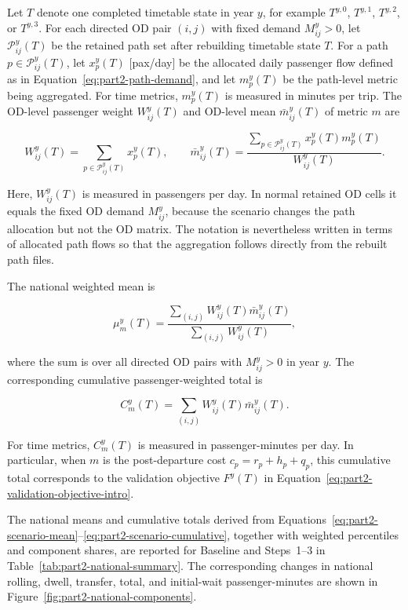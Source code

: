 \documentclass[preprint,12pt]{elsarticle}
\begin{document}
Let \(T\) denote one completed timetable state in year \(y\), for example \(T^{y,0}\), \(T^{y,1}\), \(T^{y,2}\), or \(T^{y,3}\). For each directed OD pair \((i,j)\) with fixed demand \(M_{ij}^y>0\), let \(\mathcal{P}_{ij}^{y}(T)\) be the retained path set after rebuilding timetable state \(T\). For a path \(p\in\mathcal{P}_{ij}^{y}(T)\), let \(x_p^y(T)\) [pax/day] be the allocated daily passenger flow defined as in Equation~\eqref{eq:part2-path-demand}, and let \(m_p^y(T)\) be the path-level metric being aggregated. For time metrics, \(m_p^y(T)\) is measured in minutes per trip. The OD-level passenger weight \(W_{ij}^y(T)\) and OD-level mean \(\bar m_{ij}^y(T)\) of metric \(m\) are


\begin{equation}
W_{ij}^y(T)
=
\sum_{p\in\mathcal{P}_{ij}^{y}(T)}
x_p^y(T),
\qquad
\bar m_{ij}^y(T)
=
\frac{
\sum_{p\in\mathcal{P}_{ij}^{y}(T)}
x_p^y(T)m_p^y(T)
}{
W_{ij}^y(T)
}.
\label{eq:part2-od-scenario-metric}
\end{equation}

Here, \(W_{ij}^y(T)\) is measured in passengers per day. In normal retained OD cells it equals the fixed OD demand \(M_{ij}^y\), because the scenario changes the path allocation but not the OD matrix. The notation is nevertheless written in terms of allocated path flows so that the aggregation follows directly from the rebuilt path files.

The national weighted mean is

\begin{equation}
\mu_m^y(T)
=
\frac{
\sum_{(i,j)}W_{ij}^y(T)\bar m_{ij}^y(T)
}{
\sum_{(i,j)}W_{ij}^y(T)
},
\label{eq:part2-scenario-mean}
\end{equation}

where the sum is over all directed OD pairs with \(M_{ij}^y>0\) in year \(y\). The corresponding cumulative passenger-weighted total is


\begin{equation}
C_m^y(T)
=
\sum_{(i,j)}
W_{ij}^y(T)\bar m_{ij}^y(T).
\label{eq:part2-scenario-cumulative}
\end{equation}

For time metrics, \(C_m^y(T)\) is measured in passenger-minutes per day. In particular, when \(m\) is the post-departure cost \(c_p=r_p+h_p+q_p\), this cumulative total corresponds to the validation objective \(F^y(T)\) in Equation~\eqref{eq:part2-validation-objective-intro}.

The national means and cumulative totals derived from Equations~\eqref{eq:part2-scenario-mean}--\eqref{eq:part2-scenario-cumulative}, together with weighted percentiles and component shares, are reported for Baseline and Steps~1--3 in Table~\ref{tab:part2-national-summary}. The corresponding changes in national rolling, dwell, transfer, total, and initial-wait passenger-minutes are shown in Figure~\ref{fig:part2-national-components}.
\end{document}
